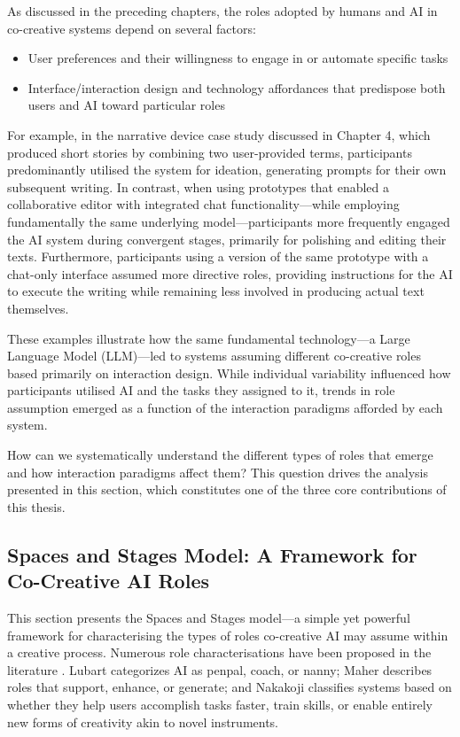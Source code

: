 As discussed in the preceding chapters, the roles adopted by humans and AI in co-creative systems depend on several factors:

\begin{itemize}
    \item User preferences and their willingness to engage in or automate specific tasks
    \item Interface/interaction design and technology affordances that predispose both users and AI toward particular roles
\end{itemize}

For example, in the narrative device case study discussed in Chapter 4, which produced short stories by combining two user-provided terms, participants predominantly utilised the system for ideation, generating prompts for their own subsequent writing. In contrast, when using prototypes that enabled a collaborative editor with integrated chat functionality—while employing fundamentally the same underlying model—participants more frequently engaged the AI system during convergent stages, primarily for polishing and editing their texts. Furthermore, participants using a version of the same prototype with a chat-only interface assumed more directive roles, providing instructions for the AI to execute the writing while remaining less involved in producing actual text themselves.

These examples illustrate how the same fundamental technology—a Large Language Model (LLM)—led to systems assuming different co-creative roles based primarily on interaction design. While individual variability influenced how participants utilised AI and the tasks they assigned to it, trends in role assumption emerged as a function of the interaction paradigms afforded by each system.

How can we systematically understand the different types of roles that emerge and how interaction paradigms affect them? This question drives the analysis presented in this section, which constitutes one of the three core contributions of this thesis.

\subsection{Spaces and Stages Model: A Framework for Co-Creative AI Roles}

This section presents the Spaces and Stages model—a simple yet powerful framework for characterising the types of roles co-creative AI may assume within a creative process. Numerous role characterisations have been proposed in the literature \cite{lubart, kantosalo}. Lubart categorizes AI as penpal, coach, or nanny; Maher describes roles that support, enhance, or generate; and Nakakoji classifies systems based on whether they help users accomplish tasks faster, train skills, or enable entirely new forms of creativity akin to novel instruments.


